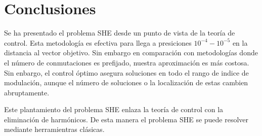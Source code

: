 \section{Conclusiones}


Se ha presentado el problema SHE desde un punto de vista de la teoría de control. Esta metodología es efectiva para llega a presiciones $10^{-4}-10^{-5}$ en la distancia al vector objetivo. Sin embargo en comparación con metodologías donde el número de conmutaciones es prefijado, nuestra aproximación es más costosa. Sin enbargo, el control óptimo asegura soluciones en todo el rango de indice de modulación, aunque el número de soluciones o la localización de estas cambien abruptamente.

Este plantamiento del problema SHE enlaza la teoría de control con la eliminación de harmónicos. De esta manera el problema SHE se puede resolver mediante herramientras clásicas.